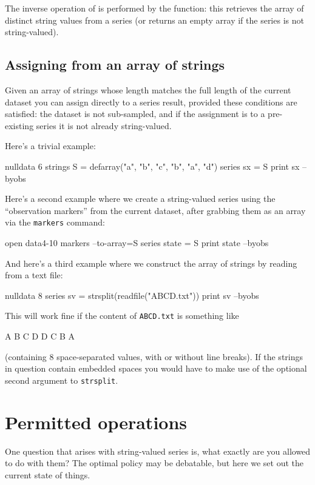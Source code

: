 The inverse operation of  is performed by the
 function: this retrieves the array of distinct string
values from a series (or returns an empty array if the series is not
string-valued).

\subsection{Assigning from an array of strings}
\label{sec:array-assign}

Given an array of strings whose length matches the full length of the
current dataset you can assign directly to a series result, provided
these conditions are satisfied: the dataset is not sub-sampled, and if
the assignment is to a pre-existing series it is not already
string-valued.

Here's a trivial example:
\begin{code}
nulldata 6
strings S = defarray("a", "b", "c", "b", "a", "d")
series sx = S
print sx --byobs
\end{code}
Here's a second example where we create a string-valued series
using the ``observation markers'' from the current dataset, after
grabbing them as an array via the \texttt{markers} command:
\begin{code}
open data4-10
markers --to-array=S
series state = S
print state --byobs
\end{code}
And here's a third example where we construct the array of strings by
reading from a text file:
\begin{code}
nulldata 8
series sv = strsplit(readfile("ABCD.txt"))
print sv --byobs
\end{code}
This will work fine if the content of \texttt{ABCD.txt} is something
like
\begin{code}
A B C D D C B A
\end{code}
(containing 8 space-separated values, with or without line breaks). If
the strings in question contain embedded spaces you would have to make
use of the optional second argument to \texttt{strsplit}.

\section{Permitted operations}

One question that arises with string-valued series is, what exactly
are you allowed to do with them? The optimal policy may be debatable,
but here we set out the current state of things.

